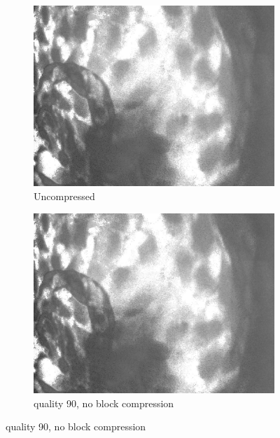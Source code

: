 \clearpage



\begin{figure}
\centering
\begin{subfigure}{.49\textwidth}
\centering
    \includegraphics[width=\textwidth]{results/quality_uncompressed.png} 
    \caption{Uncompressed}
    \label{fig:quality1}
\end{subfigure}
\begin{subfigure}{.49\textwidth}
\centering
    \includegraphics[width=\textwidth]{results/quality_90.png} 
    \caption{quality 90, no block compression}
    \label{fig:quality2}
\end{subfigure}


\end{figure}

